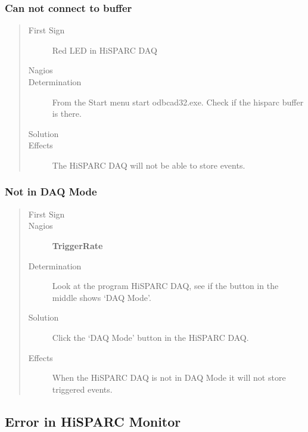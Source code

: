 \documentclass[a4paper,11pt,english]{sphinxmanual}
\begin{document}
\subsubsection{Can not connect to buffer}
\label{known-issues:can-not-connect-to-buffer}\begin{quote}\begin{description}
\item[{First Sign}] \leavevmode
Red LED in HiSPARC DAQ

\item[{Nagios}] \leavevmode
\item[{Determination}] \leavevmode
From the Start menu start odbcad32.exe. Check if the hisparc buffer is there.

\item[{Solution}] \leavevmode
\item[{Effects}] \leavevmode
The HiSPARC DAQ will not be able to store events.

\end{description}\end{quote}


\subsubsection{Not in DAQ Mode}
\label{known-issues:not-in-daq-mode}\begin{quote}\begin{description}
\item[{First Sign}] \leavevmode
\item[{Nagios}] \leavevmode
\textbf{TriggerRate}

\item[{Determination}] \leavevmode
Look at the program HiSPARC DAQ, see if the button in the middle shows `DAQ Mode'.

\item[{Solution}] \leavevmode
Click the `DAQ Mode' button in the HiSPARC DAQ.

\item[{Effects}] \leavevmode
When the HiSPARC DAQ is not in DAQ Mode it will not store triggered events.

\end{description}\end{quote}


\subsection{Error in HiSPARC Monitor}
\label{known-issues:error-in-hisparc-monitor}
\end{document}
